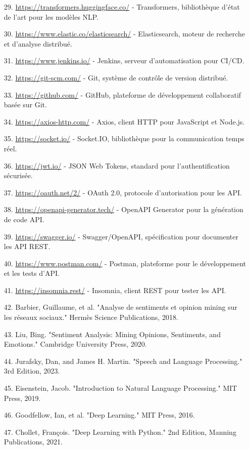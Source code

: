 \begin{itemize}[leftmargin=1cm, itemsep=0.3em, parsep=0.2em]
    \item[29.] \url{https://transformers.huggingface.co/} - Transformers, bibliothèque d'état de l'art pour les modèles NLP.
    \item[30.] \url{https://www.elastic.co/elasticsearch/} - Elasticsearch, moteur de recherche et d'analyse distribué.
    \item[31.] \url{https://www.jenkins.io/} - Jenkins, serveur d'automatisation pour CI/CD.
    \item[32.] \url{https://git-scm.com/} - Git, système de contrôle de version distribué.
    \item[33.] \url{https://github.com/} - GitHub, plateforme de développement collaboratif basée sur Git.
    \item[34.] \url{https://axios-http.com/} - Axios, client HTTP pour JavaScript et Node.js.
    \item[35.] \url{https://socket.io/} - Socket.IO, bibliothèque pour la communication temps réel.
    \item[36.] \url{https://jwt.io/} - JSON Web Tokens, standard pour l'authentification sécurisée.
    \item[37.] \url{https://oauth.net/2/} - OAuth 2.0, protocole d'autorisation pour les API.
    \item[38.] \url{https://openapi-generator.tech/} - OpenAPI Generator pour la génération de code API.
    \item[39.] \url{https://swagger.io/} - Swagger/OpenAPI, spécification pour documenter les API REST.
    \item[40.] \url{https://www.postman.com/} - Postman, plateforme pour le développement et les tests d'API.
    \item[41.] \url{https://insomnia.rest/} - Insomnia, client REST pour tester les API.
    \item[42.] Barbier, Guillaume, et al. "Analyse de sentiments et opinion mining sur les réseaux sociaux." Hermès Science Publications, 2018.
    \item[43.] Liu, Bing. "Sentiment Analysis: Mining Opinions, Sentiments, and Emotions." Cambridge University Press, 2020.
    \item[44.] Jurafsky, Dan, and James H. Martin. "Speech and Language Processing." 3rd Edition, 2023.
    \item[45.] Eisenstein, Jacob. "Introduction to Natural Language Processing." MIT Press, 2019.
    \item[46.] Goodfellow, Ian, et al. "Deep Learning." MIT Press, 2016.
    \item[47.] Chollet, François. "Deep Learning with Python." 2nd Edition, Manning Publications, 2021.

\end{itemize}
